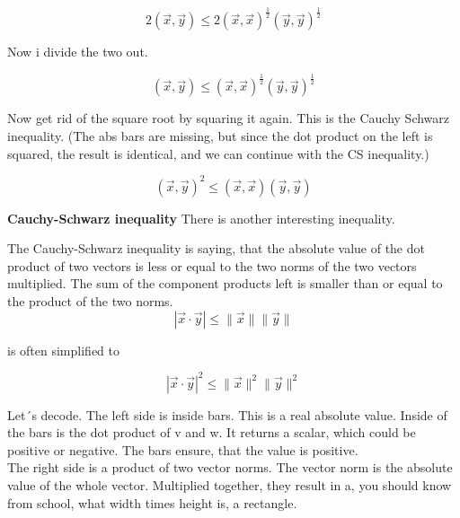 \documentclass[a4paper]{article}
\begin{document}
\begin{displaymath}
2(\vec{x},\vec{y}) \leq 2(\vec{x},\vec{x})^{\frac{1}{2}}(\vec{y},\vec{y})^{\frac{1}{2}}
\end{displaymath}

Now i divide the two out. 

\begin{displaymath}
(\vec{x},\vec{y}) \leq (\vec{x},\vec{x})^{\frac{1}{2}}(\vec{y},\vec{y})^{\frac{1}{2}}
\end{displaymath}

Now get rid of the square root by squaring it again. This is the Cauchy Schwarz inequality. (The abs bars are missing, but since the dot product on the left is squared, the result is identical, and we can continue with the CS inequality.)


\begin{displaymath}
(\vec{x},\vec{y})^{2} \leq (\vec{x},\vec{x})(\vec{y},\vec{y})
\end{displaymath}


\textbf{Cauchy-Schwarz inequality} There is another interesting inequality.

The Cauchy-Schwarz inequality is saying, that the absolute value of the dot product of two vectors is less or equal to the two norms of the two vectors multiplied. The sum of the component products left is smaller than or equal to the product of the two norms.\\

\begin{displaymath}
    |\vec{x}\cdot\vec{y}| \leq \|\vec{x}\|\|\vec{y}\|
\end{displaymath}

is often simplified to

\begin{displaymath}
    |\vec{x}\cdot\vec{y}|^{2} \leq \|\vec{x}\|^{2}\|\vec{y}\|^{2}
\end{displaymath}

Let´s decode. The left side is inside bars. This is a real absolute value. Inside of the bars is the dot product of v and w. It returns a scalar, which could be positive or negative. The bars ensure, that the value is positive.\\

The right side is a product of two vector norms. The vector norm is the absolute value of the whole vector. Multiplied together, they result in a, you should know from school, what width times height is, a rectangle. \\
\end{document}
